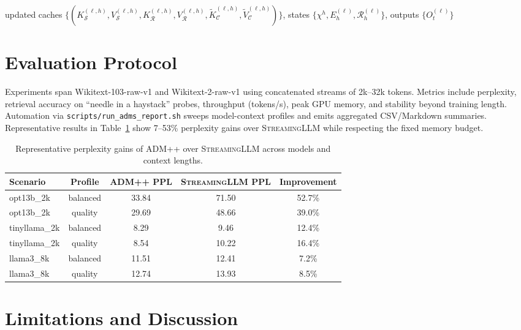 \documentclass[11pt]{article}
\newcommand{\admpp}{\textsc{ADM++}}
\newcommand{\streaming}{\textsc{StreamingLLM}}
\newcommand{\sink}{\mathcal{S}}
\newcommand{\recent}{\mathcal{R}}
\newcommand{\compressed}{\mathcal{C}}
\begin{document}
\begin{algorithm}[H]
  \Return updated caches $\{(K_{\sink}^{(\ell,h)}, V_{\sink}^{(\ell,h)}, K_{\recent}^{(\ell,h)}, V_{\recent}^{(\ell,h)}, \tilde K_{\compressed}^{(\ell,h)}, \tilde V_{\compressed}^{(\ell,h)})\}$, states $\{\chi^h, E_h^{(\ell)}, \mathcal{R}_h^{(\ell)}\}$, outputs $\{O_t^{(\ell)}\}$
\end{algorithm}

\section{Evaluation Protocol}
Experiments span Wikitext-103-raw-v1 and Wikitext-2-raw-v1 using concatenated streams of 2k--32k tokens.
Metrics include perplexity, retrieval accuracy on ``needle in a haystack'' probes, throughput (tokens/s), peak GPU memory, and stability beyond training length.
Automation via \texttt{scripts/run\_adms\_report.sh} sweeps model-context profiles and emits aggregated CSV/Markdown summaries.
Representative results in Table~\ref{tab:results} show 7--53\% perplexity gains over \streaming{} while respecting the fixed memory budget.

\begin{table}[t]
  \centering
  \begin{tabular}{lcccc}
    \toprule
    Scenario & Profile & \admpp{} PPL & \streaming{} PPL & Improvement \\
    \midrule
    opt13b\_2k & balanced & 33.84 & 71.50 & 52.7\% \\
    opt13b\_2k & quality & 29.69 & 48.66 & 39.0\% \\
    tinyllama\_2k & balanced & 8.29 & 9.46 & 12.4\% \\
    tinyllama\_2k & quality & 8.54 & 10.22 & 16.4\% \\
    llama3\_8k & balanced & 11.51 & 12.41 & 7.2\% \\
    llama3\_8k & quality & 12.74 & 13.93 & 8.5\% \\
    \bottomrule
  \end{tabular}
  \caption{Representative perplexity gains of \admpp{} over \streaming{} across models and context lengths.}
  \label{tab:results}
\end{table}

\section{Limitations and Discussion}
\end{document}

